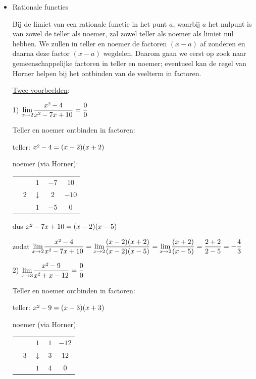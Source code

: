 \begin{itemize}
\item{Rationale functies}

Bij de limiet van een rationale functie in het punt $a$, waarbij
$a$ het nulpunt is van zowel de teller als noemer, zal zowel teller
als noemer als limiet nul hebben. We zullen in teller en noemer de
factoren $(x-a)$ af zonderen en daarna deze factor $(x-a)$ wegdelen.
Daarom gaan we eerst op zoek naar gemeenschappelijke factoren in teller
en noemer; eventueel kan de regel van Horner helpen bij het ontbinden
van de veelterm in factoren.




\uline{Twee voorbeelden}:




1) ${\displaystyle {\displaystyle \lim_{x\to2}}\frac{x\text{\texttwosuperior}-4}{x\text{\texttwosuperior}-7x+10}=\frac{0}{0}}$

Teller en noemer ontbinden in factoren:

teller: $x\text{\texttwosuperior}-4=(x-2)(x+2)$

noemer (via Horner): %
\begin{tabular}{cc|ccc}
	&  & $1$ & $-7$ & $10$\\
	& $2$ & $\downarrow$ & $2$ & $-10$\\
	\cline{2-5} 
	&  & $1$ & \multicolumn{1}{c||}{$-5$} & $0$\\
\end{tabular}

dus $x\text{\texttwosuperior}-7x+10=(x-2)(x-5)$

zodat ${\displaystyle {\displaystyle \lim_{x\to2}}\frac{x\text{\texttwosuperior}-4}{x\text{\texttwosuperior}-7x+10}={\displaystyle \lim_{x\to2}}\frac{(x-2)(x+2)}{(x-2)(x-5)}={\displaystyle \lim_{x\to2}}\frac{(x+2)}{(x-5)}=\frac{2+2}{2-5}=-\frac{4}{3}}$


2) ${\displaystyle {\displaystyle \lim_{x\to3}}\frac{x\text{\texttwosuperior}-9}{x\text{\texttwosuperior}+x-12}=\frac{0}{0}}$

Teller en noemer ontbinden in factoren:

teller: $x\text{\texttwosuperior}-9=(x-3)(x+3)$

noemer (via Horner): %
\begin{tabular}{cc|ccc}
	&  & $1$ & $1$ & $-12$\\
	& $3$ & $\downarrow$ & $3$ & $12$\\
	\cline{2-5} 
	&  & $1$ & \multicolumn{1}{c||}{$4$} & $0$\\
\end{tabular}


\end{itemize}

